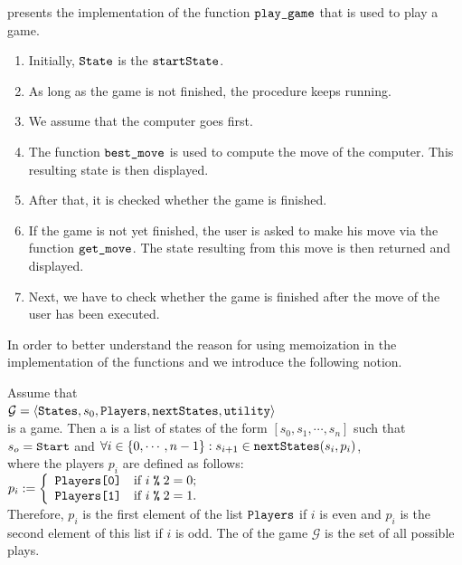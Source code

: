  presents the implementation of the function $\texttt{play\_game}$ that is used to play a game.
\begin{enumerate}
\item Initially, $\texttt{State}$ is the $\texttt{startState}$.
\item As long as the game is not finished, the procedure keeps running.
\item We assume that the computer goes first.
\item The function $\texttt{best\_move}$ is used to compute the move of the computer.
      This resulting state is then displayed.
\item After that, it is checked whether the game is finished.
\item If the game is not  yet finished, the user is asked to make his move via the function
      $\texttt{get\_move}$. The state resulting from this move is then returned and displayed.
\item Next, we have to check whether the game is finished after the  move of the user has been executed.
\end{enumerate}

In order to better understand the reason for using memoization in the implementation of the functions
 and  we introduce the following notion.
\begin{Definition}
  Assume that
  \\[0.2cm]
  \hspace*{1.3cm}
  $\mathcal{G} = \langle \texttt{States}, s_0, \texttt{Players}, \texttt{nextStates}, \texttt{utility} \rangle$
  \\[0.2cm]
  is a game. Then a  is a list of states of the form 
  $[s_0, s_1, \cdots, s_n]$  such that
  \\[0.2cm]
  \hspace*{1.3cm}
  $s_o = \texttt{Start}$ \quad and \quad $\forall i\in\{0,\cdots,n-1\}: s_{i+1} \in \texttt{nextStates}(s_i, p_i)$,
  \\[0.2cm]
  where the players $p_i$ are defined as follows:
  \\[0.2cm]
  \hspace*{1.3cm}
  $p_i := \left\{
  \begin{array}[c]{ll}
    \texttt{Players[0]} & \mbox{if $i \;\texttt{\%}\; 2 = 0$;} \\
    \texttt{Players[1]} & \mbox{if $i \;\texttt{\%}\; 2 = 1$.}
  \end{array}
  \right.
  $
  \\[0.2cm] %
  Therefore,  $p_i$ is the first element of the list $\texttt{Players}$ if $i$ is even and
  $p_i$ is the second element of this list if $i$ is odd.  The  of the game $\mathcal{G}$ is the set of all
  possible plays.  \eoxs 
\end{Definition}

